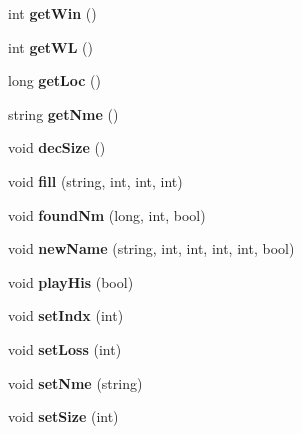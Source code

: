 \begin{DoxyCompactItemize}
int {\bfseries get\+Win} ()
\item 
\mbox{\label{class_leader_ad1e77a5f3dbd22d6771f3f355b2abdd5}} 
int {\bfseries get\+WL} ()
\item 
\mbox{\label{class_leader_a8356b533841f5cb39e277fc7d055da89}} 
long {\bfseries get\+Loc} ()
\item 
\mbox{\label{class_leader_a5849536a11ea8688666fb7ae5c47e0db}} 
string {\bfseries get\+Nme} ()
\item 
\mbox{\label{class_leader_a091103512b8bda441ca6b382ccb025e4}} 
void {\bfseries dec\+Size} ()
\item 
\mbox{\label{class_leader_abd890db97c97da720698099fbca10b81}} 
void {\bfseries fill} (string, int, int, int)
\item 
\mbox{\label{class_leader_a30282389d0b6d4b098858ebd2e2b9d72}} 
void {\bfseries found\+Nm} (long, int, bool)
\item 
\mbox{\label{class_leader_aa01999086e6c31c3d75021e158393b52}} 
void {\bfseries new\+Name} (string, int, int, int, int, bool)
\item 
\mbox{\label{class_leader_ae2ed579c7a091bdd0e1eda26027ecc14}} 
void {\bfseries play\+His} (bool)
\item 
\mbox{\label{class_leader_afcb2affddacd858eac75f3df79e55431}} 
void {\bfseries set\+Indx} (int)
\item 
\mbox{\label{class_leader_a17fe59cbb5cc3920622b76011e1a84df}} 
void {\bfseries set\+Loss} (int)
\item 
\mbox{\label{class_leader_a1caec3f7d5e02fd0c1c587579738a50e}} 
void {\bfseries set\+Nme} (string)
\item 
\mbox{\label{class_leader_a9708fb6961e49cdcade8aa606790770b}} 
void {\bfseries set\+Size} (int)
\item 
\mbox{\label{class_leader_a3e172c5dec9f9dc49f84a060df3db7e5}} 

\end{DoxyCompactItemize}
